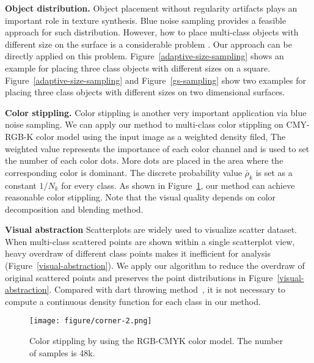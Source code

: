\textbf{Object distribution.}
Object placement without regularity artifacts plays an important role in texture synthesis.
Blue noise sampling provides a feasible approach for such distribution.
However,
how to place multi-class objects with different size on the surface is a considerable problem .
Our approach can be directly applied on this problem.
Figure~\ref{adaptive-size-sampling} shows an example for placing three class objects with different sizes on a square.
Figure~\ref{adaptive-size-sampling} and Figure~\ref{gs-sampling} show two examples for placing three class objects with different sizes on two dimensional surfaces.

\textbf{Color stippling.}
Color stippling is another very important application via blue noise sampling.
We can apply our method to multi-class color stippling on CMY-RGB-K color model using the input image as a weighted density filed,
The weighted value represents the importance of each color channel and is used to set the number of each color dots.
More dots are placed in the
area where the corresponding color is dominant.
The discrete probability value $\bar\rho_k$ is set as a constant $1/N_k$ for every class.
As shown in Figure~\ref{Color stippling},
our method can achieve reasonable color stippling.
Note that the visual quality depends on color decomposition and blending method.

\textbf{Visual abstraction}
Scatterplots are widely used to visualize scatter dataset.
When multi-class scattered points are shown within a single scatterplot view, heavy overdraw of different class points makes it inefficient for analysis (Figure~\ref{visual-abstraction}).
We apply our algorithm to reduce the overdraw of original scattered points and preserves the point distributions in Figure~\ref{visual-abstraction}.
Compared with dart throwing method~\cite{wei:2010:multi,chen:2014:visual},
it is not necessary to compute a continuous density function for each class in our method.



\begin{figure}[htb]
  \centering
    \texttt{[image: figure/corner-2.png]}
   \caption{Color stippling by using the RGB-CMYK color model.
  The number of samples is 48k.  }\label{Color stippling}
\end{figure}

